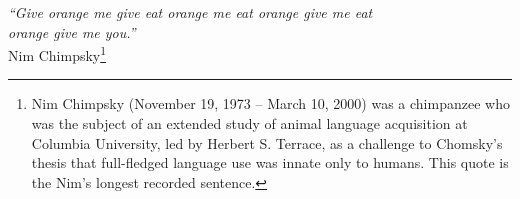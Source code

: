 \thispagestyle{plain}
\mbox{}
\vspace{2in}
\begin{center}
{\em ``Give orange me give eat orange me eat orange give me eat \\ orange give me you.''} \\ [2ex]				
\hfill
\footnotesize{Nim Chimpsky}\footnote{
\leavevmode\vspace*{-\baselineskip}
%
\vspace{7pt}
\noindent Nim Chimpsky (November 19, 1973 – March 10, 2000) was a chimpanzee who was the subject of an extended study of animal language acquisition at Columbia University, led by Herbert S. Terrace, as a challenge to Chomsky's thesis that full-fledged language use was innate only to humans. This quote is the Nim's longest recorded sentence.
 }
\end{center}
